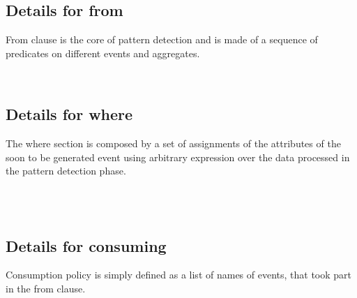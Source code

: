 \subsection{Details for from}
From clause is the core of pattern detection and is made of a sequence of predicates on different events and aggregates.
\begin{bnf*}
\end{bnf*}
\begin{bnf*}
\\
\end{bnf*}

\subsection{Details for where}
The where section is composed by a set of assignments of the attributes of the soon to be generated event using arbitrary expression over the data processed in the pattern detection phase.
\begin{bnf*}
\end{bnf*}
\begin{bnf*}
\\
\\
\end{bnf*}

\subsection{Details for consuming}
Consumption policy is simply defined as a list of names of events, that took part in the from clause. 
\begin{bnf*}
\end{bnf*}

